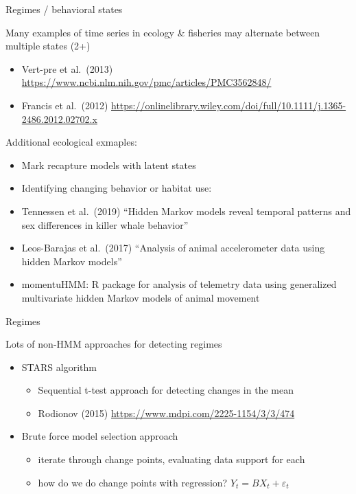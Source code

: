 \documentclass[
  ignorenonframetext,
]{beamer}
\providecommand{\tightlist}{%
  \setlength{\itemsep}{0pt}\setlength{\parskip}{0pt}}
\begin{document}
\begin{frame}{Regimes / behavioral states}
\protect\hypertarget{regimes-behavioral-states}{}

Many examples of time series in ecology \& fisheries may alternate
between multiple states (2+)

\begin{itemize}
\item
  Vert-pre et al.~(2013)
  \url{https://www.ncbi.nlm.nih.gov/pmc/articles/PMC3562848/}
\item
  Francis et al.~(2012)
  \url{https://onlinelibrary.wiley.com/doi/full/10.1111/j.1365-2486.2012.02702.x}
\end{itemize}

\end{frame}

\begin{frame}{Additional ecological exmaples:}
\protect\hypertarget{additional-ecological-exmaples}{}

\begin{itemize}
\item
  Mark recapture models with latent states
\item
  Identifying changing behavior or habitat use:
\item
  Tennessen et al.~(2019) ``Hidden Markov models reveal temporal
  patterns and sex differences in killer whale behavior''
\item
  Leos-Barajas et al.~(2017) ``Analysis of animal accelerometer data
  using hidden Markov models''
\item
  momentuHMM: R package for analysis of telemetry data using generalized
  multivariate hidden Markov models of animal movement
\end{itemize}

\end{frame}

\begin{frame}{Regimes}
\protect\hypertarget{regimes-1}{}

Lots of non-HMM approaches for detecting regimes

\begin{itemize}
\tightlist
\item
  STARS algorithm

  \begin{itemize}
  \tightlist
  \item
    Sequential t-test approach for detecting changes in the mean
  \item
    Rodionov (2015) \url{https://www.mdpi.com/2225-1154/3/3/474}
  \end{itemize}
\item
  Brute force model selection approach

  \begin{itemize}
  \tightlist
  \item
    iterate through change points, evaluating data support for each
  \item
    how do we do change points with regression?
    \({ Y }_{ t }=B{ X }_{ t }+{ \varepsilon }_{ t }\)
  \end{itemize}
\end{itemize}

\end{frame}
\end{document}
